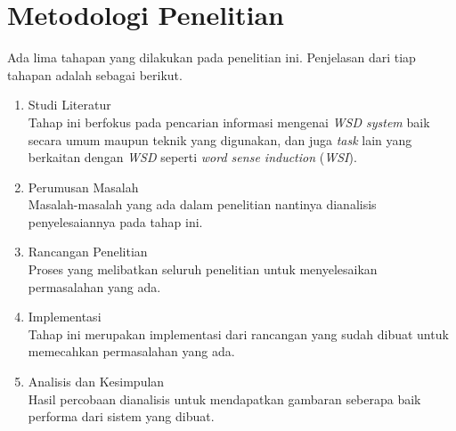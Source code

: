 \section{Metodologi Penelitian}
Ada lima tahapan yang dilakukan pada penelitian ini. Penjelasan dari tiap tahapan adalah sebagai berikut.
\begin{enumerate}
	\item Studi Literatur \\
	Tahap ini berfokus pada pencarian informasi mengenai \textit{WSD system} baik secara umum maupun teknik yang digunakan, dan juga \textit{task} lain yang berkaitan dengan \textit{WSD} seperti \textit{word sense induction} (\textit{WSI}).
	\item Perumusan Masalah \\
	Masalah-masalah yang ada dalam penelitian nantinya dianalisis penyelesaiannya pada tahap ini.
	\item Rancangan Penelitian\\
	Proses yang melibatkan seluruh penelitian untuk menyelesaikan permasalahan yang ada.
	\item Implementasi\\
	Tahap ini merupakan implementasi dari rancangan yang sudah dibuat untuk memecahkan permasalahan yang ada.
	\item Analisis dan Kesimpulan \\
	Hasil percobaan dianalisis untuk mendapatkan gambaran seberapa baik performa dari sistem yang dibuat.
\end{enumerate}


